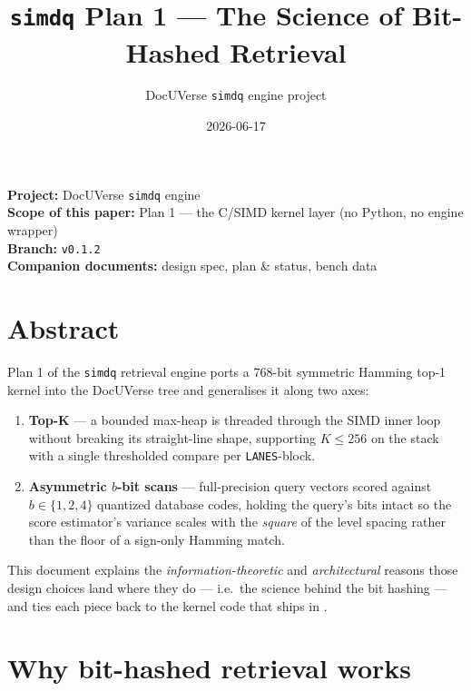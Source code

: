 \documentclass[11pt,a4paper]{article}
\title{\texttt{simdq} Plan 1 --- The Science of Bit-Hashed Retrieval}
\author{DocUVerse \texttt{simdq} engine project}
\date{2026-06-17}
\begin{document}
\maketitle

\begin{center}
\small
\textbf{Project:} DocUVerse \texttt{simdq} engine \\
\textbf{Scope of this paper:} Plan 1 --- the C/SIMD kernel layer (no Python, no engine wrapper) \\
\textbf{Branch:} \texttt{v0.1.2} \\
\textbf{Companion documents:} design spec, plan \& status, bench data
\end{center}

\vspace{1em}

\section{Abstract}

Plan 1 of the \texttt{simdq} retrieval engine ports a 768-bit symmetric
Hamming top-1 kernel into the DocUVerse tree and generalises it along
two axes:

\begin{enumerate}
    \item \textbf{Top-K} --- a bounded max-heap is threaded through the
    SIMD inner loop without breaking its straight-line shape, supporting
    $K \le 256$ on the stack with a single thresholded compare per
    \texttt{LANES}-block.
    \item \textbf{Asymmetric $b$-bit scans} --- full-precision query
    vectors scored against $b \in \{1, 2, 4\}$ quantized database codes,
    holding the query's bits intact so the score estimator's variance
    scales with the \emph{square} of the level spacing rather than the
    floor of a sign-only Hamming match.
\end{enumerate}

This document explains the \emph{information-theoretic} and
\emph{architectural} reasons those design choices land where they do
--- i.e.\ the science behind the bit hashing --- and ties each piece
back to the kernel code that ships in
.

\section{Why bit-hashed retrieval works}
\end{document}
